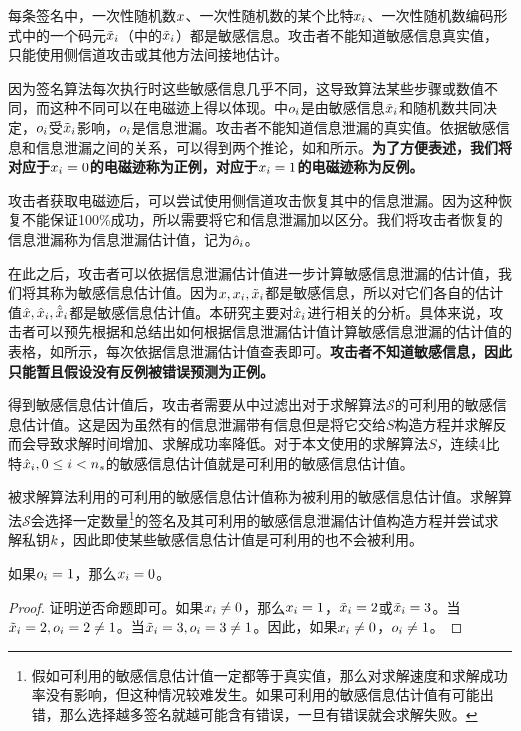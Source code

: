 {	每条签名中，一次性随机数$x$、一次性随机数的某个比特$x_i$、一次性随机数编码形式中的一个码元$\tilde {x}_i$（中的$\tilde{x}_i$）都是敏感信息。攻击者不能知道敏感信息真实值，只能使用侧信道攻击或其他方法间接地估计。
	
	因为签名算法每次执行时这些敏感信息几乎不同，这导致算法某些步骤或数值不同，而这种不同可以在电磁迹上得以体现。中$o_i$是由敏感信息$\tilde{x}_i$和随机数共同决定，$o_i$受$\tilde{x}_i$影响，$o_i$是信息泄漏。攻击者不能知道信息泄漏的真实值。依据敏感信息和信息泄漏之间的关系，可以得到两个推论，如和所示。\textbf{为了方便表述，我们将对应于$x_i=0$的电磁迹称为正例，对应于$x_i=1$的电磁迹称为反例。}
	
	攻击者获取电磁迹后，可以尝试使用侧信道攻击恢复其中的信息泄漏。因为这种恢复不能保证100\%成功，所以需要将它和信息泄漏加以区分。我们将攻击者恢复的信息泄漏称为信息泄漏估计值，记为$\hat {o}_i$。
	
	在此之后，攻击者可以依据信息泄漏估计值进一步计算敏感信息泄漏的估计值，我们将其称为敏感信息估计值。因为$x,x_i,\tilde {x}_i$都是敏感信息，所以对它们各自的估计值$\hat {x},\hat{x}_i,\hat{\tilde {x}}_i$都是敏感信息估计值。本研究主要对$\hat{x}_i$进行相关的分析。具体来说，攻击者可以预先根据和总结出如何根据信息泄漏估计值计算敏感信息泄漏的估计值的表格，如所示，每次依据信息泄漏估计值查表即可。\textbf{攻击者不知道敏感信息，因此只能暂且假设没有反例被错误预测为正例。}
	
	得到敏感信息估计值后，攻击者需要从中过滤出对于求解算法$\mathcal S$的可利用的敏感信息估计值。这是因为虽然有的信息泄漏带有信息但是将它交给$S$构造方程并求解反而会导致求解时间增加、求解成功率降低。对于本文使用的求解算法$S$，连续4比特$\hat {x}_i,0\le i<n_s$的敏感信息估计值就是可利用的敏感信息估计值。
	
	被求解算法利用的可利用的敏感信息估计值称为被利用的敏感信息估计值。求解算法$\mathcal S$会选择一定数量\footnote{假如可利用的敏感信息估计值一定都等于真实值，那么对求解速度和求解成功率没有影响，但这种情况较难发生。如果可利用的敏感信息估计值有可能出错，那么选择越多签名就越可能含有错误，一旦有错误就会求解失败。}的签名及其可利用的敏感信息泄漏估计值构造方程并尝试求解私钥$k$，因此即使某些敏感信息估计值是可利用的也不会被利用。

	\begin{corollary}\label{cor:highbitinfo}
		如果$o_i=1$，那么$x_i=0$。
	\end{corollary}
	\begin{proof}
		证明逆否命题即可。如果$x_i\neq0$，那么$x_i=1$，$\tilde {x}_i=2$或$\tilde {x}_i=3$。当$\tilde {x}_i=2,o_i=2\neq1$。当$\tilde {x}_i=3,o_i=3\neq1$。因此，如果$x_i\neq0$，$o_i\neq1$。
	\end{proof}

}
